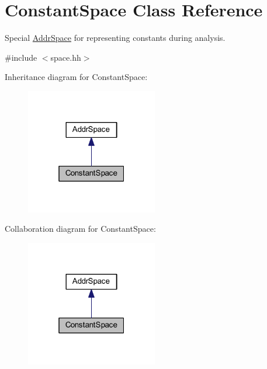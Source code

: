 \hypertarget{class_constant_space}{}\section{Constant\+Space Class Reference}
\label{class_constant_space}


Special \mbox{\hyperlink{class_addr_space}{Addr\+Space}} for representing constants during analysis.  




{\ttfamily \#include $<$space.\+hh$>$}



Inheritance diagram for Constant\+Space\+:
\nopagebreak
\begin{figure}[H]
\begin{center}
\leavevmode
\includegraphics[width=163pt]{class_constant_space__inherit__graph}
\end{center}
\end{figure}


Collaboration diagram for Constant\+Space\+:
\nopagebreak
\begin{figure}[H]
\begin{center}
\leavevmode
\includegraphics[width=163pt]{class_constant_space__coll__graph}
\end{center}
\end{figure}
